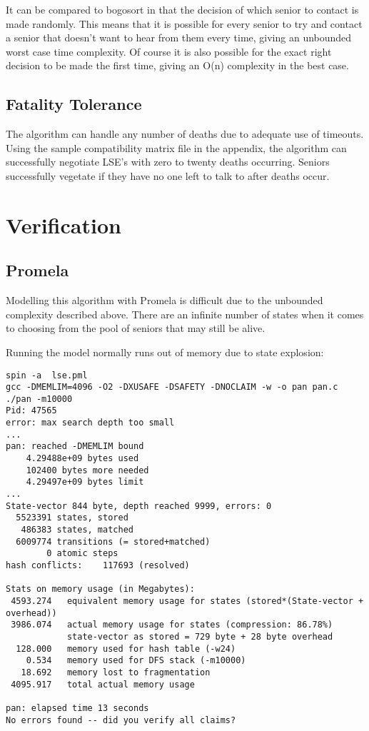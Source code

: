 \documentclass[a4paper]{article}
\begin{document}
It can be compared to bogosort in that the decision of which senior to contact is made randomly. This means that it is possible for every senior to try and contact a senior that doesn't want to hear from them every time, giving an unbounded worst case time complexity. Of course it is also possible for the exact right decision to be made the first time, giving an O(n) complexity in the best case. 

\subsection{Fatality Tolerance}
The algorithm can handle any number of deaths due to adequate use of timeouts. Using the sample compatibility matrix file in the appendix, the algorithm can successfully negotiate LSE's with zero to twenty deaths occurring. Seniors successfully vegetate if they have no one left to talk to after deaths occur. 

\section{Verification}
\subsection{Promela}
Modelling this algorithm with Promela is difficult due to the unbounded complexity described above. There are an infinite number of states when it comes to choosing from the pool of seniors that may still be alive.

Running the model normally runs out of memory due to state explosion:
\begin{verbatim}
spin -a  lse.pml
gcc -DMEMLIM=4096 -O2 -DXUSAFE -DSAFETY -DNOCLAIM -w -o pan pan.c
./pan -m10000 
Pid: 47565
error: max search depth too small
...
pan: reached -DMEMLIM bound
	4.29488e+09 bytes used
	102400 bytes more needed
	4.29497e+09 bytes limit
...
State-vector 844 byte, depth reached 9999, errors: 0
  5523391 states, stored
   486383 states, matched
  6009774 transitions (= stored+matched)
        0 atomic steps
hash conflicts:    117693 (resolved)

Stats on memory usage (in Megabytes):
 4593.274	equivalent memory usage for states (stored*(State-vector + overhead))
 3986.074	actual memory usage for states (compression: 86.78%)
         	state-vector as stored = 729 byte + 28 byte overhead
  128.000	memory used for hash table (-w24)
    0.534	memory used for DFS stack (-m10000)
   18.692	memory lost to fragmentation
 4095.917	total actual memory usage

pan: elapsed time 13 seconds
No errors found -- did you verify all claims?
\end{verbatim}
\end{document}

